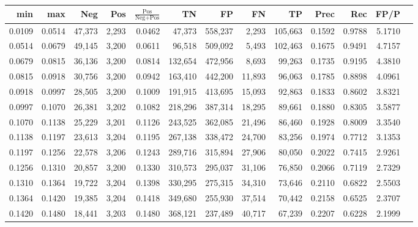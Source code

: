 \begin{tabular}{rrrrrrrrrrrrr}
\toprule
   min &    max &    Neg &   Pos & $\frac{\text{Pos}}{\text{Neg}+\text{Pos}}$ &      TN &      FP &      FN &      TP &   Prec &    Rec &   FP/P \\
\midrule
0.0109 & 0.0514 & 47,373 & 2,293 &                                     0.0462 &  47,373 & 558,237 &   2,293 & 105,663 & 0.1592 & 0.9788 & 5.1710 \\
0.0514 & 0.0679 & 49,145 & 3,200 &                                     0.0611 &  96,518 & 509,092 &   5,493 & 102,463 & 0.1675 & 0.9491 & 4.7157 \\
0.0679 & 0.0815 & 36,136 & 3,200 &                                     0.0814 & 132,654 & 472,956 &   8,693 &  99,263 & 0.1735 & 0.9195 & 4.3810 \\
0.0815 & 0.0918 & 30,756 & 3,200 &                                     0.0942 & 163,410 & 442,200 &  11,893 &  96,063 & 0.1785 & 0.8898 & 4.0961 \\
0.0918 & 0.0997 & 28,505 & 3,200 &                                     0.1009 & 191,915 & 413,695 &  15,093 &  92,863 & 0.1833 & 0.8602 & 3.8321 \\
0.0997 & 0.1070 & 26,381 & 3,202 &                                     0.1082 & 218,296 & 387,314 &  18,295 &  89,661 & 0.1880 & 0.8305 & 3.5877 \\
0.1070 & 0.1138 & 25,229 & 3,201 &                                     0.1126 & 243,525 & 362,085 &  21,496 &  86,460 & 0.1928 & 0.8009 & 3.3540 \\
0.1138 & 0.1197 & 23,613 & 3,204 &                                     0.1195 & 267,138 & 338,472 &  24,700 &  83,256 & 0.1974 & 0.7712 & 3.1353 \\
0.1197 & 0.1256 & 22,578 & 3,206 &                                     0.1243 & 289,716 & 315,894 &  27,906 &  80,050 & 0.2022 & 0.7415 & 2.9261 \\
0.1256 & 0.1310 & 20,857 & 3,200 &                                     0.1330 & 310,573 & 295,037 &  31,106 &  76,850 & 0.2066 & 0.7119 & 2.7329 \\
0.1310 & 0.1364 & 19,722 & 3,204 &                                     0.1398 & 330,295 & 275,315 &  34,310 &  73,646 & 0.2110 & 0.6822 & 2.5503 \\
0.1364 & 0.1420 & 19,385 & 3,204 &                                     0.1418 & 349,680 & 255,930 &  37,514 &  70,442 & 0.2158 & 0.6525 & 2.3707 \\
0.1420 & 0.1480 & 18,441 & 3,203 &                                     0.1480 & 368,121 & 237,489 &  40,717 &  67,239 & 0.2207 & 0.6228 & 2.1999 \\

\end{tabular}

